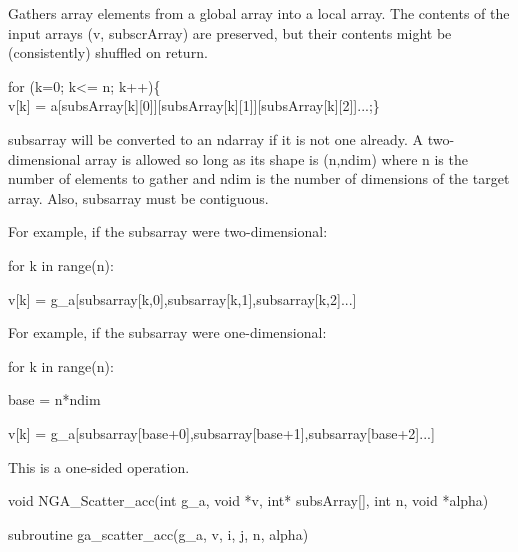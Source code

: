 \documentclass[12pt]{article}
\begin{document}
\begin{desc}

Gathers array elements from a global array into a local array. The 
contents of the input arrays (v, subscrArray) are preserved, but their 
contents might be (consistently) shuffled on return.
 
 
for (k=0; k<= n; k++)\{\\v[k] = a[subsArray[k][0]][subsArray[k][1]][subsArray[k][2]]...;\}\    

subsarray will be converted to an ndarray if it is not one already. 
A two-dimensional array is allowed so long as its shape is (n,ndim) 
where n is the number of elements to gather and ndim is the number 
of dimensions of the target array. Also, subsarray must be contiguous.

For example, if the subsarray were two-dimensional:

for k in range(n):

    v[k] = g_a[subsarray[k,0],subsarray[k,1],subsarray[k,2]...]

For example, if the subsarray were one-dimensional:


for k in range(n):

    base = n*ndim

    v[k] = g_a[subsarray[base+0],subsarray[base+1],subsarray[base+2]...]



This is a one-sided operation.

\end{desc}


\begin{capi}
\begin{ccode}
void NGA_Scatter_acc(int g_a, void *v, int* subsArray[], int n, void *alpha)
\end{ccode}
\begin{funcargs}
\end{funcargs}
\end{capi}

\begin{f2dapi}
\begin{fcode}
subroutine ga_scatter_acc(g_a, v, i, j, n, alpha)
\end{fcode}
\begin{funcargs}
\end{funcargs}
\end{f2dapi}
\end{document}
